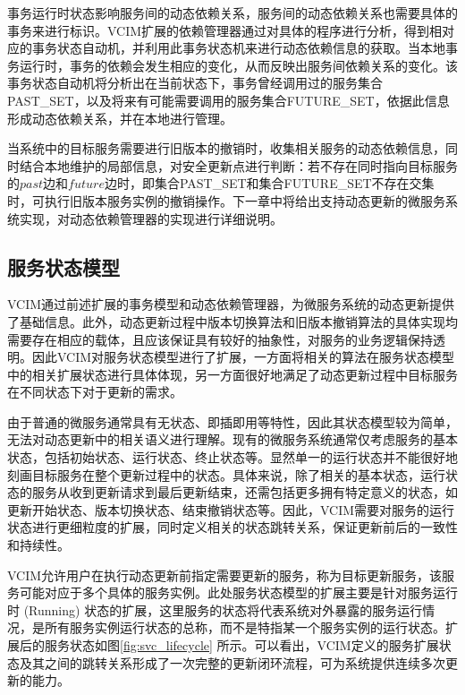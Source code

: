 \documentclass[macfonts,master]{njuthesis}
\begin{document}
事务运行时状态影响服务间的动态依赖关系，服务间的动态依赖关系也需要具体的事务来进行标识。VCIM扩展的依赖管理器通过对具体的程序进行分析，得到相对应的事务状态自动机，并利用此事务状态机来进行动态依赖信息的获取\cite{su2013automated}。当本地事务运行时，事务的依赖会发生相应的变化，从而反映出服务间依赖关系的变化。该事务状态自动机将分析出在当前状态下，事务曾经调用过的服务集合PAST\_SET，以及将来有可能需要调用的服务集合FUTURE\_SET，依据此信息形成动态依赖关系，并在本地进行管理。

当系统中的目标服务需要进行旧版本的撤销时，收集相关服务的动态依赖信息，同时结合本地维护的局部信息，对安全更新点进行判断：若不存在同时指向目标服务的$past$边和$future$边时，即集合PAST\_SET和集合FUTURE\_SET不存在交集时，可执行旧版本服务实例的撤销操作。下一章中将给出支持动态更新的微服务系统实现，对动态依赖管理器的实现进行详细说明。

\subsection{服务状态模型}
VCIM通过前述扩展的事务模型和动态依赖管理器，为微服务系统的动态更新提供了基础信息。此外，动态更新过程中版本切换算法和旧版本撤销算法的具体实现均需要存在相应的载体，且应该保证具有较好的抽象性，对服务的业务逻辑保持透明。因此VCIM对服务状态模型进行了扩展，一方面将相关的算法在服务状态模型中的相关扩展状态进行具体体现，另一方面很好地满足了动态更新过程中目标服务在不同状态下对于更新的需求。

由于普通的微服务通常具有无状态、即插即用等特性，因此其状态模型较为简单，无法对动态更新中的相关语义进行理解。现有的微服务系统通常仅考虑服务的基本状态，包括初始状态、运行状态、终止状态等。显然单一的运行状态并不能很好地刻画目标服务在整个更新过程中的状态。具体来说，除了相关的基本状态，运行状态的服务从收到更新请求到最后更新结束，还需包括更多拥有特定意义的状态，如更新开始状态、版本切换状态、结束撤销状态等。因此，VCIM需要对服务的运行状态进行更细粒度的扩展，同时定义相关的状态跳转关系，保证更新前后的一致性和持续性。 

VCIM允许用户在执行动态更新前指定需要更新的服务，称为目标更新服务，该服务可能对应于多个具体的服务实例。此处服务状态模型的扩展主要是针对服务运行时 (Running) 状态的扩展，这里服务的状态将代表系统对外暴露的服务运行情况，是所有服务实例运行状态的总称，而不是特指某一个服务实例的运行状态。扩展后的服务状态如图\ref{fig:svc_lifecycle} 所示。可以看出，VCIM定义的服务扩展状态及其之间的跳转关系形成了一次完整的更新闭环流程，可为系统提供连续多次更新的能力。
\end{document}
